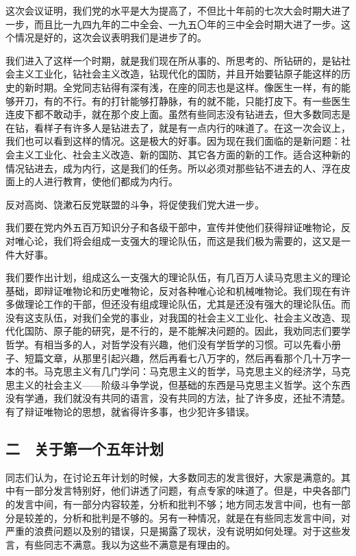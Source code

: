 这次会议证明，我们党的水平是大为提高了，不但比十年前的七次大会时期大进了一步，而且比一九四九年的二中全会、一九五〇年的三中全会时期大进了一步。这个情况是好的，这次会议表明我们是进步了的。

我们进入了这样一个时期，就是我们现在所从事的、所思考的、所钻研的，是钻社会主义工业化，钻社会主义改造，钻现代化的国防，并且开始要钻原子能这样的历史的新时期。全党同志钻得有深有浅，在座的同志也是这样。像医生一样，有的能够开刀，有的不行。有的打针能够打静脉，有的就不能，只能打皮下。有一些医生连皮下都不敢动手，就在那个皮上面。虽然有些同志没有钻进去，但大多数同志是在钻，看样子有许多人是钻进去了，就是有一点内行的味道了。在这一次会议上，我们也可以看到这样的情况。这是极大的好事。因为现在我们面临的是新问题：社会主义工业化、社会主义改造、新的国防、其它各方面的新的工作。适合这种新的情况钻进去，成为内行，这是我们的任务。所以必须对那些钻不进去的人、浮在皮面上的人进行教育，使他们都成为内行。

反对高岗、饶漱石反党联盟的斗争，将促使我们党大进一步。

我们要在党内外五百万知识分子和各级干部中，宣传并使他们获得辩证唯物论，反对唯心论，我们将会组成一支强大的理论队伍，而这是我们极为需要的，这又是一件大好事。

我们要作出计划，组成这么一支强大的理论队伍，有几百万人读马克思主义的理论基础，即辩证唯物论和历史唯物论，反对各种唯心论和机械唯物论。我们现在有许多做理论工作的干部，但还没有组成理论队伍，尤其是还没有强大的理论队伍。而没有这支队伍，对我们全党的事业，对我国的社会主义工业化、社会主义改造、现代化国防、原子能的研究，是不行的，是不能解决问题的。因此，我劝同志们要学哲学。有相当多的人，对哲学没有兴趣，他们没有学哲学的习惯。可以先看小册子、短篇文章，从那里引起兴趣，然后再看七八万字的，然后再看那个几十万字一本的书。马克思主义有几门学问：马克思主义的哲学，马克思主义的经济学，马克思主义的社会主义——阶级斗争学说，但基础的东西是马克思主义哲学。这个东西没有学通，我们就没有共同的语言，没有共同的方法，扯了许多皮，还扯不清楚。有了辩证唯物论的思想，就省得许多事，也少犯许多错误。

\subsection{二　关于第一个五年计划}

同志们认为，在讨论五年计划的时候，大多数同志的发言很好，大家是满意的。其中有一部分发言特别好，他们讲透了问题，有点专家的味道了。但是，中央各部门的发言中间，有一部分内容较差，分析和批判不够；地方同志发言中间，也有一部分是较差的，分析和批判是不够的。另有一种情况，就是在有些同志发言中间，对严重的浪费问题以及别的错误，只是揭露了现状，没有说明如何处理。对于这些发言，有些同志不满意。我以为这些不满意是有理由的。

